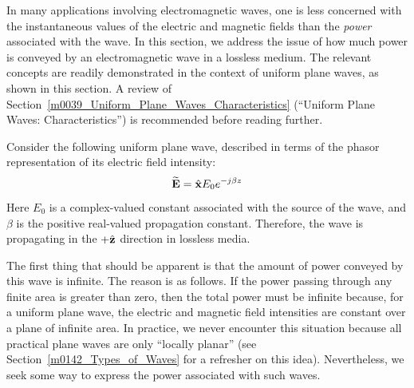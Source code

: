 

\label{m00041_Plane_Wave_Power_Density_in_a_Lossless_Medium} %

In many applications involving electromagnetic waves, one is less concerned with the instantaneous values of the electric and magnetic fields than the \emph{power} associated with the wave. 
In this section, we address the issue of how much power is conveyed by an electromagnetic wave in a lossless medium.
The relevant concepts are readily demonstrated in the context of uniform plane waves, 
as shown in this section.
A review of Section~\ref{m0039_Uniform_Plane_Waves_Characteristics} (``Uniform Plane Waves: Characteristics'') is recommended before reading further.

Consider the following uniform plane wave, described in terms of the phasor representation of its electric field intensity:
%
\begin{equation}
\widetilde{\bf E} = \hat{\bf x}E_0 e^{-j\beta z}
\label{m0041_eE}
\end{equation}
%
Here $E_0$ is a complex-valued constant associated with the source of the wave, and $\beta$ is the positive real-valued propagation constant.  
Therefore, the wave is propagating in the $+\hat{\bf z}$ direction in lossless media.

The first thing that should be apparent is that the amount of power conveyed by this wave is infinite.
The reason is as follows. If the power passing through any finite area is greater than zero, then the total power must be infinite because, for a uniform plane wave, the electric and magnetic field intensities are constant over a plane of infinite area.
In practice, we never encounter this situation because all practical plane waves are only ``locally planar'' (see Section~\ref{m0142_Types_of_Waves} for a refresher on this idea).
Nevertheless, we seek some way to express the power associated with such waves.

